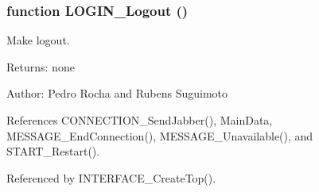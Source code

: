 \subsubsection[LOGIN\_\-Logout]{\setlength{\rightskip}{0pt plus 5cm}function LOGIN\_\-Logout ()}\label{login_2login_8js_99309ad6248506daca001f0118fc922f}


Make logout. 

\begin{Desc}
\item[Returns:]none \end{Desc}
\begin{Desc}
\item[Author:]Pedro Rocha and Rubens Suguimoto \end{Desc}


References CONNECTION\_\-SendJabber(), MainData, MESSAGE\_\-EndConnection(), MESSAGE\_\-Unavailable(), and START\_\-Restart().

Referenced by INTERFACE\_\-CreateTop().